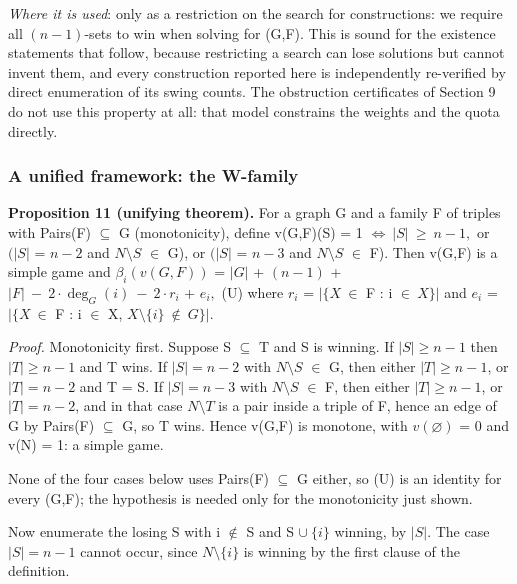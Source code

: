 \documentclass[
]{article}
\begin{document}
\emph{Where it is used}: only as a restriction on the search for
constructions: we require all \((n-1)\)-sets to win when solving for
(G,F). This is sound for the existence statements that follow, because
restricting a search can lose solutions but cannot invent them, and
every construction reported here is independently re-verified by direct
enumeration of its swing counts. The obstruction certificates of Section
9 do not use this property at all: that model constrains the weights and
the quota directly.

\subsubsection{A unified framework: the
W-family}\label{a-unified-framework-the-w-family}

\textbf{Proposition 11 (unifying theorem).} For a graph G and a family F
of triples with Pairs(F) \(\subseteq\) G (monotonicity), define
v(G,F)(S) = 1 \(\iff\ \vert S\vert\ \ge\ n-1,\) or \((\vert S\vert\) =
\(n-2\) and \(N\setminus S\) \(\in\) G), or \((\vert S\vert\) = \(n-3\)
and \(N\setminus S\) \(\in\) F). Then v(G,F) is a simple game and
\(\beta_i(v(G,F))\) = \(\vert G\vert\) + \((n-1)\) +
\(\vert F\vert\ -\ 2\cdot\deg_G(i)\ -\ 2\cdot r_i\) + \(e_i,\) (U) where
\(r_i\) = \(\vert\{X\ \in\) F : i \(\in\ X\}\vert\) and \(e_i\) =
\(\vert\{X\ \in\) F : i \(\in\) X,
\(X\setminus\{i\}\ \notin\ G\}\vert.\)

\emph{Proof.} Monotonicity first. Suppose S \(\subseteq\) T and S is
winning. If \(|S| \ge n-1\) then \(|T| \ge n-1\) and T wins. If
\(|S| = n-2\) with \(N\setminus S\) \(\in\) G, then either
\(|T| \ge n-1\), or \(|T| = n-2\) and T = S. If \(|S| = n-3\) with
\(N\setminus S\) \(\in\) F, then either \(|T| \ge n-1\), or
\(|T| = n-2\), and in that case \(N\setminus T\) is a pair inside a
triple of F, hence an edge of G by Pairs(F) \(\subseteq\) G, so T wins.
Hence v(G,F) is monotone, with \(v(\varnothing)\) = 0 and v(N) = 1: a
simple game.

None of the four cases below uses Pairs(F) \(\subseteq\) G either, so
(U) is an identity for every (G,F); the hypothesis is needed only for
the monotonicity just shown.

Now enumerate the losing S with i \(\notin\) S and S \(\cup\ \{i\}\)
winning, by \(|S|\). The case \(|S| = n-1\) cannot occur, since
\(N\setminus\{i\}\) is winning by the first clause of the definition.
\end{document}
